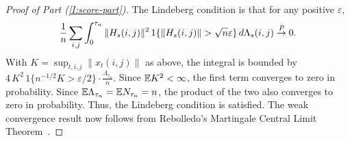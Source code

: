 \documentclass[aoas,preprint]{imsart}
\begin{document}
\begin{proof}[Proof of Part \textit{(\ref{I:score-part})}]
The Lindeberg condition is that for any positive $\varepsilon$,
\[
    \frac{1}{n}
    \sum_{i,j}
    \int_{0}^{\tau_n}
        \| H_s(i,j) \|^2
        \, 1\{\| H_s(i,j) \| > \sqrt{n} \varepsilon \}
        \, d\Lambda_s(i,j)
        \overset{\mathit{P}}{\to}
        0.
\]
With $K = \sup_{t,i,j} \| x_t(i,j)\|$ as above, the integral is bounded by
\(
    4 \, K^2 \, 1\{n^{-1/2} K > \varepsilon / 2\}
    \cdot
    \frac{\Lambda_{\tau_n}}{n}.
\)
Since $\mathbb{E} K^2 < \infty$, the first term converges to zero in probability.
Since $\mathbb{E} \Lambda_{\tau_n} = \mathbb{E} N_{\tau_n} = n$, the product of the two also
converges to zero in probability.  Thus, the Lindeberg condition is satisfied.
The weak convergence result now follows from Rebolledo's Martingale Central
Limit Theorem~\cite{rebolledo1980central}.
\end{proof}
\end{document}
